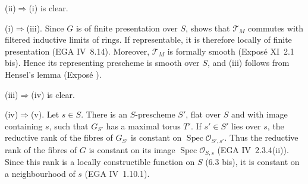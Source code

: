
\textup{(ii)}\(\Rightarrow\)\textup{(i)} is clear.

\textup{(i)}\(\Rightarrow\)\textup{(iii)}.
Since \(G\) is of finite presentation over \(S\), 
shows that \(\mathcal T_M\) commutes with filtered inductive limits
of rings. If representable, it is therefore locally of finite
presentation (EGA IV~8.14). Moreover, \(\mathcal T_M\) is formally
smooth (Exposé XI~2.1 bis). Hence its representing prescheme is
smooth over \(S\), and \textup{(iii)} follows from Hensel's lemma
(Exposé ).

\textup{(iii)}\(\Rightarrow\)\textup{(iv)} is clear.

\textup{(iv)}\(\Rightarrow\)\textup{(v)}.
Let \(s\in S\). There is an \(S\)-prescheme \(S'\), flat over \(S\)
and with image containing \(s\), such that \(G_{S'}\) has a maximal
torus \(T'\). If \(s'\in S'\) lies over \(s\), the reductive rank of
the fibres of \(G_{S'}\) is constant on
\(\operatorname{Spec}\mathcal O_{S',s'}\). Thus the reductive rank
of the fibres of \(G\) is constant on its image
\(\operatorname{Spec}\mathcal O_{S,s}\)
(EGA IV~2.3.4(ii)). Since this rank is a locally constructible
function on \(S\) (6.3 bis), it is constant on a neighbourhood of
\(s\) (EGA IV~1.10.1).

